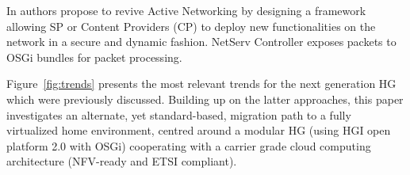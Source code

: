 In \cite{lee_netserv:_2011} authors propose to revive Active Networking by designing a framework allowing SP or Content Providers (CP) to deploy new functionalities on the network in a secure and dynamic fashion.
NetServ Controller exposes packets to OSGi bundles for packet processing.

Figure~\ref{fig:trends} presents the most relevant trends for the next generation HG which were previously discussed.
Building up on the latter approaches, this paper investigates an alternate, yet standard-based, migration path to a fully virtualized home environment, centred around a modular HG (using HGI open platform 2.0 with OSGi) cooperating with a carrier grade cloud computing architecture (NFV-ready and ETSI compliant).

